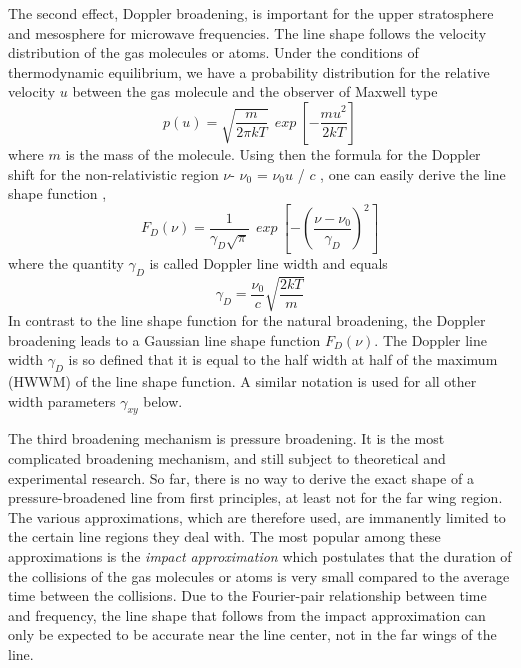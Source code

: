 The second effect, Doppler broadening, is important for the upper
stratosphere and mesosphere for microwave frequencies. The line shape
follows the velocity distribution of the gas molecules or atoms. Under the
conditions of thermodynamic equilibrium, we have  a probability distribution for
the relative velocity $u$ between the gas molecule and the observer of Maxwell
type 
\begin{equation}\label{eq:abs_theory:maxwell_distribution1}
  p(u)=\sqrt{\frac{m}{2\pi kT}}~~exp~\left[-\frac{mu^2}{2kT}\right]
\end{equation}
where $m$ is the mass of the molecule. Using then the formula for the
Doppler shift for the non-relativistic region    $\nu$- $\nu_0$ =
$\nu_0$$u$ / $c$ , one can easily derive the line shape function \citep{bernath:95}, 
\begin{equation}
 F_D(\nu)=\frac{1}{\gamma_D\sqrt{\pi}}~~exp~\left[-\left(\frac{\nu - \nu_0}{\gamma_D}\right)^2\right]
\end{equation}
where the quantity $\gamma_D$ is called Doppler line width and equals
\begin{equation}
 \gamma_D=\frac{\nu_0}{c}\sqrt{\frac{2kT}{m}}
\end{equation}
In contrast to the line shape function for the natural
broadening, the Doppler broadening leads to a Gaussian
line shape function $F_D(\nu)$. The Doppler line width $\gamma_D$ is so
defined that it is equal to the half width at half of the maximum
(HWWM) of the line shape function. A similar notation is used
for all other width parameters $\gamma_{xy}$ below.

The third broadening mechanism is pressure broadening.  It is the most
complicated broadening mechanism, and still subject to theoretical and
experimental research. So far, there is no way to derive the exact
shape of a pressure-broadened line from first principles, at least not
for the far wing region. The various approximations, which are
therefore used, are immanently limited to the certain line regions
they deal with.  The most popular among these approximations is the
{\it{impact approximation}} which postulates that the duration of the
collisions of the gas molecules or atoms is very small compared to the average
time between the collisions.  Due to the Fourier-pair relationship
between time and frequency, the line shape that follows from the
impact approximation can only be expected to be accurate near the line
center, not in the far wings of the line.

